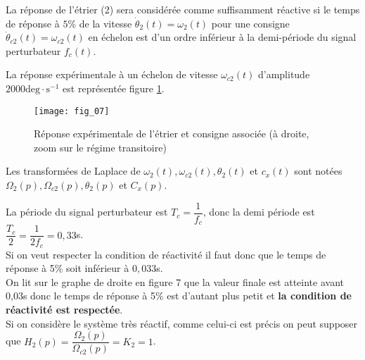 La réponse de l'étrier (2) sera considérée comme suffisamment réactive si le temps de réponse à $5 \%$ de la vitesse $\dot{\theta}_{2}(t)=\omega_{2}(t)$ pour une consigne $\dot{\theta}_{c 2}(t)=\omega_{c 2}(t)$ en échelon est d'un ordre inférieur à la demi-période du signal perturbateur $f_{c}(t)$.

La réponse expérimentale à un échelon de vitesse $\omega_{c 2}(t)$ d'amplitude $2000 \mathrm{deg} \cdot \mathrm{s}^{-1}$ est représentée figure \ref{fig:07}.

\begin{figure}[!h]
\centering
\texttt{[image: fig\_07]}
\caption{\label{fig:07}Réponse expérimentale de l'étrier et consigne associée (à droite, zoom sur le régime transitoire)}
\end{figure}

Les transformées de Laplace de $\omega_{2}(t), \omega_{c 2}(t), \theta_{2}(t)$ et $c_{x}(t)$ sont notées $\Omega_{2}(p), \Omega_{c 2}(p), \theta_{2}(p)$ et $C_{x}(p)$.
\fi

\ifprof
\begin{corrige}
La période du signal perturbateur est $T_c = \dfrac{1}{f_c}$, donc la demi période est $\dfrac{T_c}{2} = \dfrac{1}{2f_c} = 0,33$s.\\

Si on veut respecter la condition de réactivité il faut donc que le temps de réponse à 5\% soit inférieur à $0,033$s.\\

On lit sur le graphe de droite en figure 7 que la valeur finale est atteinte avant 0,03s donc le temps de réponse à 5\% est d'autant plus petit et \textbf{la condition de réactivité est respectée}.\\

Si on considère le système très réactif, comme celui-ci est précis on peut supposer que $\boxed{H_2(p) = \dfrac{\Omega_2(p)}{\Omega_{c2}(p)} = K_2 = 1}$.
\end{corrige}
\else
\fi



